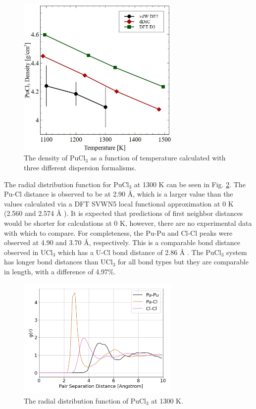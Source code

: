 \documentclass[review]{elsarticle}
\providecommand{\DIFaddtex}[1]{{\protect\color{blue} \sf #1}} %
\providecommand{\DIFaddbegin}{} %
\providecommand{\DIFaddend}{} %
\providecommand{\DIFadd}[1]{\texorpdfstring{\DIFaddtex{#1}}{#1}} %
\newcommand{\DIFaddincludegraphics}[2][]{{\color{blue}\fbox{\DIFOincludegraphics[#1]{#2}}}} %
\DeclareRobustCommand{\DIFaddbegin}{\DIFOaddbegin \let\includegraphics\DIFaddincludegraphics} %
\DeclareRobustCommand{\DIFaddend}{\DIFOaddend \let\includegraphics\DIFOincludegraphics} %
\begin{document}
\begin{figure}[h!]
 \centering
 \includegraphics[width=0.7\textwidth]{PuCl-density.jpg} 
 \caption{The density of PuCl$_3$ as a function of temperature calculated with three different dispersion formalisms.}
 \label{fig:pucl3_density}
\end{figure}

The radial distribution function for PuCl$_3$ at 1300 K can be seen in Fig. \ref{fig:rdf_pucl3}. The Pu-Cl distance is observed to be at 2.90 {\AA}, which is a larger value than the values calculated via a DFT SVWN5 local functional approximation at 0 K (2.560 and 2.574 {\AA} \cite{buz2012dft}). It is expected that predictions of first neighbor distances would be shorter for calculations at 0 K, however, there are no experimental data with which to compare. For completeness, the Pu-Pu and Cl-Cl peaks were observed at 4.90 and 3.70 {\AA}, respectively. \DIFaddbegin \DIFadd{This is a comparable bond distance observed in UCl$_3$ which has a U-Cl bond distance of 2.86 }{\DIFadd{\AA}}\DIFadd{\cite{ANDERSSON2022153836}. The PuCl$_3$ system has longer bond distances than UCl$_3$ for all bond types but they are comparable in length, with a difference of 4.97\%.
}\DIFaddend 

\begin{figure}[h!]
 \centering
 \includegraphics[width=0.7\textwidth]{rdf_pucl3_1300K.png} 
 \caption{The radial distribution function of PuCl$_3$ at 1300 K.}
 \label{fig:rdf_pucl3}
\end{figure}
\end{document}
